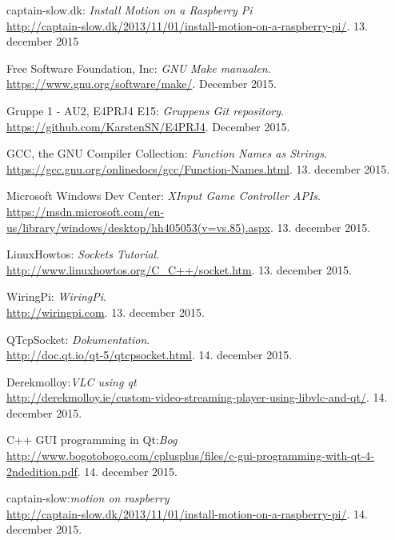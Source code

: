 \begin{thebibliography}{2}
captain-slow.dk: \textit{Install Motion on a Raspberry Pi} \\
\url{http://captain-slow.dk/2013/11/01/install-motion-on-a-raspberry-pi/}. 13. december 2015

 Free Software Foundation, Inc: \textit{GNU Make manualen}. \\
\url{https://www.gnu.org/software/make/}. December 2015.

 Gruppe 1 - AU2, E4PRJ4 E15: \textit{Gruppens Git repository}. \\
\url{https://github.com/KarstenSN/E4PRJ4}. December 2015.

 GCC, the GNU Compiler Collection: \textit{Function Names as Strings}. \\
\url{https://gcc.gnu.org/onlinedocs/gcc/Function-Names.html}. 13. december 2015.

 Microsoft Windows Dev Center: \textit{XInput Game Controller APIs}. \\
\url{https://msdn.microsoft.com/en-us/library/windows/desktop/hh405053(v=vs.85).aspx}. 13. december 2015.

 LinuxHowtos: \textit{Sockets Tutorial}. \\
\url{http://www.linuxhowtos.org/C_C++/socket.htm}. 13. december 2015.

 WiringPi: \textit{WiringPi}. \\
\url{http://wiringpi.com}. 13. december 2015.

 QTcpSocket: \textit{Dokumentation}. \\
\url{http://doc.qt.io/qt-5/qtcpsocket.html}. 14. december 2015.

 Derekmolloy:\textit{VLC using qt} \\
\url{http://derekmolloy.ie/custom-video-streaming-player-using-libvlc-and-qt/}. 14. december 2015.

 C++ GUI programming in Qt:\textit{Bog} \\
\url{http://www.bogotobogo.com/cplusplus/files/c-gui-programming-with-qt-4-2ndedition.pdf}. 14. december 2015.

 captain-slow:\textit{motion on raspberry} \\
\url{http://captain-slow.dk/2013/11/01/install-motion-on-a-raspberry-pi/}. 14. december 2015.


\end{thebibliography}
